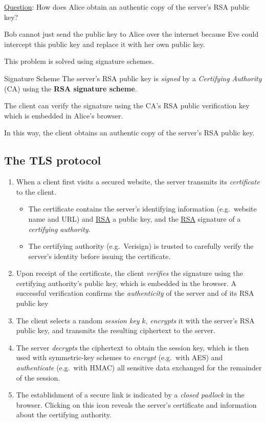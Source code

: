 \underline{Question}: How does Alice obtain an authentic copy
of the server's RSA public key?

Bob cannot just send the public key to Alice over the internet because Eve could
intercept this public key and replace it with her own public key.

This problem is solved using signature schemes.

\begin{Definition}{Signature Scheme}{}
    The server's RSA public key is \emph{signed} by a
    \emph{Certifying Authority} (CA) using the
    \textbf{RSA signature scheme}.
\end{Definition}
The client can verify the signature using the CA's RSA public verification key
which is embedded in Alice's browser.

In this way, the client obtains an authentic copy of the server's RSA public key.

\subsection*{The TLS protocol}
\begin{enumerate}
    \item When a client first visits
          a secured website, the server transmits its \emph{certificate} to the client.
          \begin{itemize}
              \item The certificate contains the server's identifying
                    information (e.g.\ website name and URL)
                    and \underline{RSA} a public key, and the \underline{RSA} signature
                    of a \emph{certifying authority}.
              \item The certifying authority (e.g.\ Verisign) is trusted
                    to carefully verify the server's identity before issuing the certificate.
          \end{itemize}
    \item Upon receipt of the certificate, the client \emph{verifies} the
          signature using the certifying authority’s public key,
          which is embedded in the browser. A successful
          verification confirms the \emph{authenticity} of the server and
          of its RSA public key
    \item The client selects a random \emph{session key} $ k $, \emph{encrypts} it
          with the server’s RSA public key, and transmits the
          resulting ciphertext to the server.
    \item The server \emph{decrypts} the ciphertext to obtain the
          session key, which is then used with symmetric-key schemes
          to \emph{encrypt} (e.g.\ with AES) and \emph{authenticate}
          (e.g.\ with HMAC) all sensitive data exchanged for the remainder of the session.
    \item The establishment of a secure link is indicated by a
          \emph{closed padlock} in the browser. Clicking on this icon
          reveals the server’s certificate and information about
          the certifying authority.
\end{enumerate}

